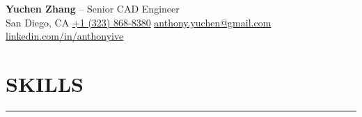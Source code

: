 \documentclass[10pt]{article}
\begin{document}
\begin{center}
  {\LARGE \textbf{Yuchen Zhang} -- Senior CAD Engineer} \\
  San Diego, CA \quad\textbar\quad \href{tel:13238688380}{+1 (323) 868-8380} \quad\textbar\quad \href{mailto:anthony.yuchen@gmail.com}{anthony.yuchen@gmail.com} \quad\textbar\quad \href{https://linkedin.com/in/anthonyive}{linkedin.com/in/anthonyive}
\end{center}



\vspace*{0.01in}

\section*{\MakeUppercase{Skills}}
\hrule
\medskip
\end{document}
